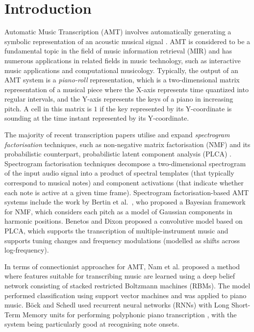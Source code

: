 \section{Introduction} 
\label{sec:introduction}

Automatic Music Transcription (AMT) involves automatically generating a symbolic representation of an acoustic musical signal \cite{Benetos2013b}. AMT is considered to be a fundamental topic in the field of music information retrieval (MIR) and has numerous applications in related fields in music technology, such as interactive music applications and computational musicology. Typically, the output of an AMT system is a \textit{piano-roll} representation, which is a two-dimensional matrix representation of a musical piece where the X-axis represents time quantized into regular intervals, and the Y-axis represents the keys of a piano in increasing pitch. A cell in this matrix is $1$ if the key represented by its Y-coordinate is sounding at the time instant represented by its Y-coordinate.

The majority of recent transcription papers utilise and expand \emph{spectrogram factorisation} techniques, such as non-negative matrix factorisation (NMF) \cite{Li1999} and its probabilistic counterpart, probabilistic latent component analysis (PLCA) \cite{Smaragdis2006}. Spectrogram factorisation techniques decompose a two-dimensional spectrogram of the input audio signal into a product of spectral templates (that typically correspond to musical notes) and component activations (that indicate whether each note is active at a given time frame). Spectrogram factorisation-based AMT systems include the work by Bertin et al.\ \cite{Bertin2009}, who proposed a Bayesian framework for NMF, which considers each pitch as a model of Gaussian components in harmonic positions. Benetos and Dixon \cite{Benetos2012} proposed a convolutive model based on PLCA, which supports the transcription of multiple-instrument music and supports tuning changes and frequency modulations (modelled as shifts across log-frequency). 

In terms of connectionist approaches for AMT, Nam et al. \cite{Nam2011} proposed a method where features suitable for transcribing music are learned using a deep belief network consisting of stacked restricted Boltzmann machines (RBMs). The model performed classification using support vector machines and was applied to piano music. B\"{o}ck and Schedl used recurrent neural networks (RNNs) with Long Short-Term Memory units for performing polyphonic piano transcription \cite{Bock2012}, with the system being particularly good at recognising note onsets. 

